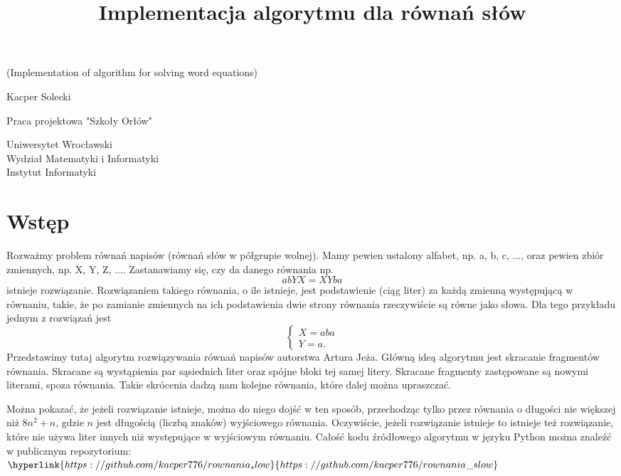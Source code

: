 \documentclass[leqno, 12pt]{article}
\title{Implementacja algorytmu dla równań słów}
\date{}
\newcommand\blankpage{%
    \null
    \thispagestyle{empty}%
    \newpage}
\begin{document}
\maketitle
\begin{center}
    (Implementation of algorithm for solving word equations)
\end{center}
\vspace{10pt}
\begin{center}
    Kacper Solecki
\end{center}
\vspace{40pt}
\begin{center}
    Praca projektowa "Szkoły Orłów"
\end{center}
\vspace{60pt}
\begin{center}
    Uniwersytet Wrocławski \\
    Wydział Matematyki i Informatyki \\
    Instytut Informatyki
\end{center}
\afterpage{\blankpage}
\newpage

\doublespacing
\tableofcontents
\singlespacing
\newpage

\section{Wstęp}
Rozważmy problem równań napisów (równań słów w półgrupie wolnej). Mamy pewien ustalony alfabet, np. a, b, c, ..., oraz pewien zbiór zmiennych, np. X, Y, Z, .... Zastanawiamy się, czy da danego równania np. $$abYX = XYba$$ istnieje rozwiązanie. Rozwiązaniem takiego równania, o ile istnieje,
jest podstawienie (ciąg liter) za każdą zmienną występującą w równaniu, takie, że po zamianie zmiennych na ich podstawienia dwie strony równania rzeczywiście są równe jako słowa. Dla tego przykładu jednym z rozwiązań jest
$$
\begin{cases}
X = aba \\
Y = a.
\end{cases}
$$
Przedstawimy tutaj algorytm rozwiązywania równań napisów autorstwa Artura Jeża. Główną ideą algorytmu jest skracanie fragmentów równania. Skracane są wystąpienia par sąsiednich liter oraz spójne bloki tej samej litery.
Skracane fragmenty zastępowane są nowymi literami, spoza równania. Takie skrócenia dadzą nam kolejne równania, które dalej można upraszczać.

Można pokazać, że jeżeli rozwiązanie istnieje, można do niego dojść w ten sposób, przechodząc tylko przez równania o długości nie większej niż $8n^2 + n$, gdzie $n$ jest długością (liczbą znaków) wyjściowego równania.
Oczywiście, jeżeli rozwiązanie istnieje to istnieje też rozwiązanie, które nie używa liter innych niż występujące w wyjściowym równaniu.
\newline\newline
Całość kodu źródłowego algorytmu w języku Python można znaleźć \\ w publicznym repozytorium: \\ $\hyperlink{https://github.com/kacper776/rownania_slow}{https://github.com/kacper776/rownania\_slow}$
\end{document}
